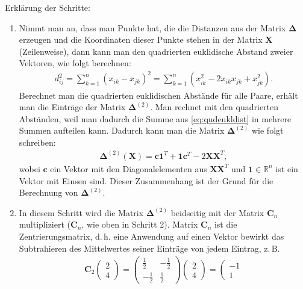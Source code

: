 Erklärung der Schritte:
\begin{enumerate}
 \item Nimmt man an, dass man Punkte hat, die die Distanzen aus der Matrix $\mathbf{\Delta}$ erzeugen und die 
 Koordinaten dieser Punkte stehen in der Matrix $\mathbf{X}$ (Zeilenweise),
  dann kann man den quadrierten  euklidische Abstand zweier Vektoren, wie folgt berechnen:
  \begin{align}
   d^2_{ij} = \sum_{k=1}^{n}(x_{ik}-x_{jk})^2 = \sum_{k=1}^{n} (x_{ik}^2 -2x_{ik}x_{jk}+x_{jk}^2). \label{eq:qudeukldist}
  \end{align}
  Berechnet man die quadrierten  euklidischen Abstände für alle Paare, erhält man die Einträge der Matrix $\mathbf{\Delta}^{(2)}$. Man rechnet
  mit den quadrierten Abständen, weil man dadurch die Summe aus \eqref{eq:qudeukldist} in mehrere Summen aufteilen kann. Dadurch kann man die 
  Matrix $\mathbf{\Delta}^{(2)}$ wie folgt schreiben:
  \begin{align*}
   \mathbf{\Delta}^{(2)}(\mathbf{X}) = \mathbf{c}\mathbf{1}^T + \mathbf{1}\mathbf{c}^T - 2\mathbf{X}\mathbf{X}^T,
  \end{align*}
wobei $\mathbf{c}$ ein Vektor mit den Diagonalelementen aus $\mathbf{X}\mathbf{X}^T$ und $\mathbf{1}\in \mathbb{R}^n$ ist ein Vektor mit Einsen sind.
Dieser Zusammenhang ist der Grund für die Berechnung von $\mathbf{\Delta}^{(2)}$.
\item In diesem Schritt wird die Matrix $\mathbf{\Delta}^{(2)}$ beidseitig mit der Matrix $\mathbf{C}_n$ multipliziert ($\mathbf{C}_n$, wie oben in Schritt 2).
Matrix $\mathbf{C}_n$ ist die Zentrierungsmatrix, d.\,h. eine Anwendung auf einen Vektor bewirkt das Subtrahieren des Mittelwertes seiner Einträge von jedem Eintrag, z.\,B.
\begin{align*}
 \mathbf{C}_2 \left( \begin{matrix}
 2 \\
 4 
\end{matrix} \right)
=
\left( \begin{matrix}
 \frac{1}{2} & -\frac{1}{2} \\
 -\frac{1}{2}& \frac{1}{2} 
\end{matrix} \right) \left( \begin{matrix}
 2 \\
 4 
\end{matrix} \right)
=
\left(
\begin{matrix}
 -1 \\
 1 
\end{matrix}

\end{align*}
\end{enumerate}
